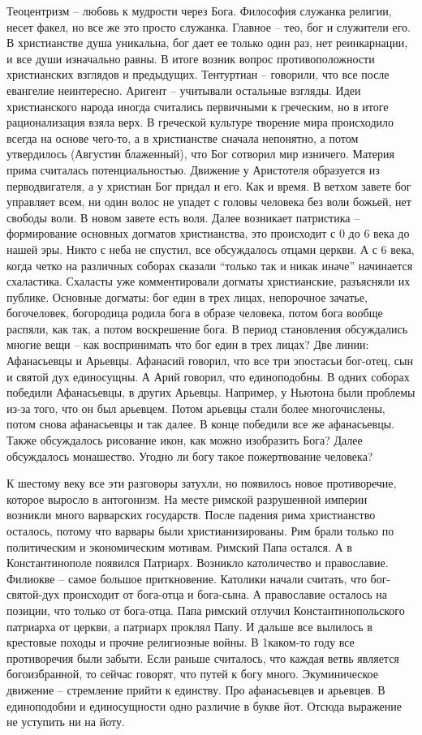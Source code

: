 \documentclass[a4paper, 12pt]{article}
\begin{document}
Теоцентризм -- любовь к мудрости через Бога. Философия служанка религии, несет факел, но все же это просто служанка. Главное -- тео, бог и служители его. В христианстве душа уникальна, бог дает ее только один раз, нет реинкарнации, и все души изначально равны. В итоге возник вопрос противоположности христианских взглядов и предыдущих. Тентуртиан -- говорили, что все после евангелие неинтересно. Аригент -- учитывали остальные взгляды. Идеи христианского народа иногда считались первичными к греческим, но в итоге рационализация взяла верх. В греческой культуре творение мира происходило всегда на основе чего-то, а в христианстве сначала непонятно, а потом утвердилось (Августин блаженный), что Бог сотворил мир изничего. Материя прима считалась потенциальностью. Движение у Аристотеля образуется из перводвигателя, а у христиан Бог придал и его. Как и время. В ветхом завете бог управляет всем, ни один волос не упадет с головы человека без воли божьей, нет свободы воли. В новом завете есть воля. Далее возникает патристика -- формирование основных догматов христианства, это происходит с 0 до 6 века до нашей эры. Никто с неба не спустил, все обсуждалось отцами церкви. А с 6 века, когда четко на различных соборах сказали ``только так и никак иначе'' начинается схаластика. Схаласты уже комментировали догматы христианские, разъясняли их публике. Основные догматы: бог един в трех лицах, непорочное зачатье, богочеловек, богородица родила бога в образе человека, потом бога вообще распяли, как так, а потом воскрешение бога. В период становления обсуждались многие вещи -- как воспринимать что бог един в трех лицах? Две линии: Афанасьевцы и Арьевцы. Афанасий говорил, что все три эпостасьи бог-отец, сын и святой дух единосущны. А Арий говорил, что единоподобны. В одних соборах победили Афанасьевцы, в других Арьевцы. Например, у Ньютона были проблемы из-за того, что он был арьевцем. Потом арьевцы стали более многочислены, потом снова афанасьевцы и так далее. В конце победили все же афанасьевцы. Также обсуждалось рисование икон, как можно изобразить Бога? Далее обсуждалось монашество. Угодно ли богу такое пожертвование человека? 

К шестому веку все эти разговоры затухли, но появилось новое противоречие, которое выросло в антогонизм. На месте римской разрушенной империи возникли много варварских государств. После падения рима христианство осталось, потому что варвары были христианизированы. Рим брали только по политическим и экономическим мотивам. Римский Папа остался. А в Константинополе появился Патриарх. Возникло католичество и православие. Филиокве -- самое большое приткновение. Католики начали считать, что бог-святой-дух происходит от бога-отца и бога-сына. А православие осталось на позиции, что только от бога-отца. Папа римский отлучил Константинопольского патриарха от церкви, а патриарх проклял Папу. И дальше все вылилось в крестовые походы и прочие религиозные войны. В 1каком-то году все противоречия были забыти. Если раньше считалось, что каждая ветвь является богоизбранной, то сейчас говорят, что путей к богу много. Экуминическое движение -- стремление прийти к единству. Про афанасьевцев и арьевцев. В единоподобии и единосущности одно различие в букве йот. Отсюда выражение не уступить ни на йоту. 
\end{document}
